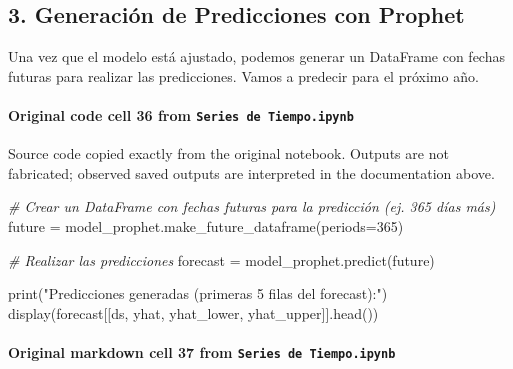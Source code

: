 \documentclass[
  11pt,
]{article}
\newenvironment{Shaded}{}{}
\newcommand{\BuiltInTok}[1]{\textcolor[rgb]{0.00,0.50,0.00}{#1}}
\newcommand{\CommentTok}[1]{\textcolor[rgb]{0.38,0.63,0.69}{\textit{#1}}}
\newcommand{\DecValTok}[1]{\textcolor[rgb]{0.25,0.63,0.44}{#1}}
\newcommand{\NormalTok}[1]{#1}
\newcommand{\OperatorTok}[1]{\textcolor[rgb]{0.40,0.40,0.40}{#1}}
\newcommand{\StringTok}[1]{\textcolor[rgb]{0.25,0.44,0.63}{#1}}
\begin{document}
\subsection{3. Generación de Predicciones con Prophet}\label{3-generaciuxf3n-de-predicciones-con-prophet}

Una vez que el modelo está ajustado, podemos generar un DataFrame con fechas futuras para realizar las predicciones. Vamos a predecir para el próximo año.

\paragraph{\texorpdfstring{Original code cell 36 from \texttt{Series\ de\ Tiempo.ipynb}}{Original code cell 36 from Series de Tiempo.ipynb}}\label{original-code-cell-36-from-series-de-tiempoipynb}

Source code copied exactly from the original notebook. Outputs are not fabricated; observed saved outputs are interpreted in the documentation above.

\begin{Shaded}
\begin{Highlighting}[]
\CommentTok{\# Crear un DataFrame con fechas futuras para la predicción (ej. 365 días más)}
\NormalTok{future }\OperatorTok{=}\NormalTok{ model\_prophet.make\_future\_dataframe(periods}\OperatorTok{=}\DecValTok{365}\NormalTok{)}

\CommentTok{\# Realizar las predicciones}
\NormalTok{forecast }\OperatorTok{=}\NormalTok{ model\_prophet.predict(future)}

\BuiltInTok{print}\NormalTok{(}\StringTok{"Predicciones generadas (primeras 5 filas del forecast):"}\NormalTok{)}
\NormalTok{display(forecast[[}\StringTok{\textquotesingle{}ds\textquotesingle{}}\NormalTok{, }\StringTok{\textquotesingle{}yhat\textquotesingle{}}\NormalTok{, }\StringTok{\textquotesingle{}yhat\_lower\textquotesingle{}}\NormalTok{, }\StringTok{\textquotesingle{}yhat\_upper\textquotesingle{}}\NormalTok{]].head())}
\end{Highlighting}
\end{Shaded}

\paragraph{\texorpdfstring{Original markdown cell 37 from \texttt{Series\ de\ Tiempo.ipynb}}{Original markdown cell 37 from Series de Tiempo.ipynb}}\label{original-markdown-cell-37-from-series-de-tiempoipynb}
\end{document}
